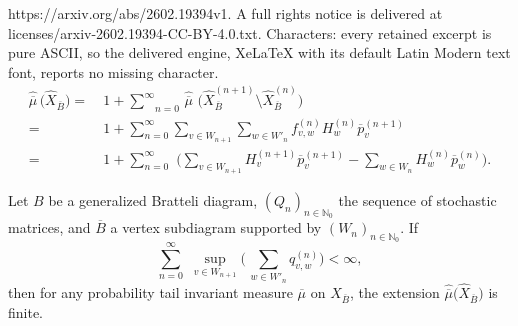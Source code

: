 \documentclass[10pt,a4paper]{amsart}
\def\ol{\overline}
\def\wh{\widehat}
\newcommand{\N}{\mathbb N}
\begin{document}
https://arxiv.org/abs/2602.19394v1. A full rights notice is delivered at licenses/arxiv-2602.19394-CC-BY-4.0.txt. Characters: every retained excerpt is pure ASCII, so the delivered engine, XeLaTeX with its default Latin Modern text font, reports no missing character.
\begin{align}
    \wh{\ol  \mu} \,\big( \wh X_{\overline B} \big)   =&\  1 + \underset{n=0}{\overset{\infty}{\sum}}\, \wh{\ol  \mu} \,\,\big( \wh X_{\overline B}^{(n+1)} \setminus \wh X_{\overline B}^{(n)} \big) \nonumber\\
=&\ 1 + \sum_{n=0}^\infty \sum_{v \in W_{n+1}} 
\sum_{w \in W'_n} f^{(n)}_{v,w} H_w^{(n)} \ol p_v^{(n+1)}\label{eq: exten_representation}\\
=&\  1 +  \sum_{n=0}^\infty \,\,\bigg( \sum_{v \in W_{n+1}}
H_v^{(n+1)}\overline p_v^{(n+1)} - 
 \sum_{w \in W_{n}} H_w^{(n)}\overline p_w^{(n)}\bigg).\label{eq: exten_representation_1}
\end{align}

\begin{theorem}\label{thm3 sufficient cond}
Let $B$ be a generalized Bratteli diagram, 
$(Q_n)_{n \in \N_0}$ the sequence of stochastic matrices, and $\overline B$ a vertex subdiagram supported by $(W_n)_{n \in \N_0}$. If \begin{equation}\label{eq3:suff cond finiteness}
    \sum_{n=0}^\infty\,\,\underset{v \in W_{n+1}}{\sup} 
    \Big(\,\underset{w \in W'_{n}}{\sum} q_{v,w}^{(n)} \Big) < \infty,
\end{equation} then for any probability tail invariant measure $\ol\mu$ on $X_{\overline B}$, the extension $\wh{\ol\mu} \big(\wh X_{\overline B}\big)$ is finite.
\end{theorem}
\end{document}
